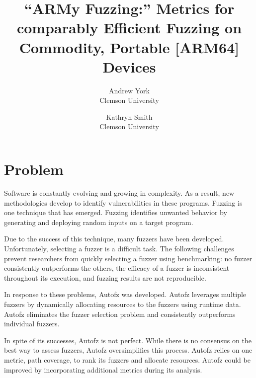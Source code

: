 
\graphicspath{ {./images/} }

\date{}

\title{\Large \bf “ARMy Fuzzing:” Metrics for comparably Efficient Fuzzing on Commodity, 
Portable [ARM64] Devices}

\author{
{\rm Andrew York}\\
Clemson University
\and
{\rm Kathryn Smith}\\
Clemson University
} %

\maketitle

\section{Problem}

Software is constantly evolving and growing in complexity. As a result, 
new methodologies develop to identify vulnerabilities in these programs. 
Fuzzing is one technique that has emerged. Fuzzing identifies unwanted behavior 
by generating and deploying random inputs on a target program. \cite{Ecezia}

Due to the success of this technique, many fuzzers have been developed. 
Unfortunately, selecting a fuzzer is a difficult task. The following challenges 
prevent researchers from quickly selecting a fuzzer using benchmarking: no fuzzer 
consistently outperforms the others, the efficacy of a fuzzer is inconsistent 
throughout its execution, and fuzzing results are not reproducible. 

In response to these problems, Autofz was developed. Autofz leverages multiple 
fuzzers by dynamically allocating resources to the fuzzers using runtime data. 
Autofz eliminates the fuzzer selection problem and consistently outperforms 
individual fuzzers. 

In spite of its successes, Autofz is not perfect. While there is no consensus on
the best way to assess fuzzers, Autofz oversimplifies this process. Autofz relies
on one metric, path coverage, to rank its fuzzers and allocate resources. Autofz 
could be improved by incorporating additional metrics during its analysis. 

